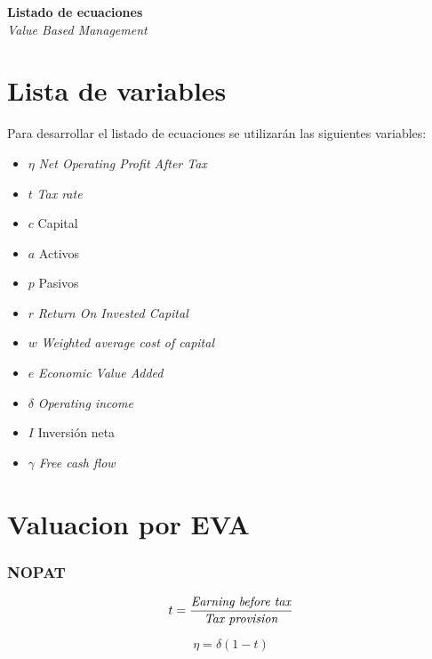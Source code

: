 \begin{center}
    {\huge \textbf{Listado de ecuaciones}}\\
    \vspace{0.5cm}
    {\large \textit{Value Based Management}}
\end{center}

\begin{multicols}{2}

\section{Lista de variables}
Para desarrollar el listado de ecuaciones se utilizarán las siguientes variables:

\begin{itemize}
    \item $\eta$ \textit{Net Operating Profit After Tax}
    \item $t$ \textit{Tax rate}
    \item $c$ Capital
    \item $a$ Activos
    \item $p$ Pasivos
    \item $r$ \textit{Return On Invested Capital}
    \item $w$ \textit{Weighted average cost of capital}
    \item $e$ \textit{Economic Value Added}
    \item $\delta$ \textit{Operating income}
    \item $I$ Inversión neta
    \item $\gamma$ \textit{Free cash flow}
\end{itemize}

\section{Valuacion por EVA}

\subsubsection*{NOPAT}

\begin{equation}
    t = \frac{\textrm{\textit{Earning before tax}}}{\textrm{\textit{Tax provision}}}
\end{equation}

\begin{equation}
    \eta = \delta(1-t)
\end{equation}


\end{multicols}

